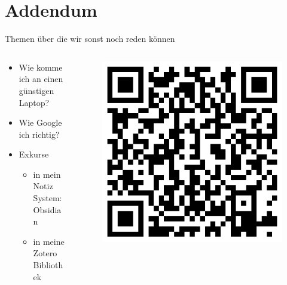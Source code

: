 \documentclass[aspectratio=169,shownotes]{beamer}
\begin{document}
\section{Addendum}
\begin{frame}{Themen über die wir sonst noch reden können}
    \begin{columns}
        \begin{column}{0.6\textwidth}
            \begin{itemize}
                \item Wie komme ich an einen günstigen Laptop?
                \item Wie Google ich richtig?
                \item Exkurse
                \begin{itemize}
                    \item in mein Notiz System: Obsidian
                    \item in meine Zotero Bibliothek
                \end{itemize} 
            \end{itemize}
        \end{column}
        \begin{column}{0.4\textwidth}
            \begin{figure}
                \begin{flushleft}
                    \includegraphics[width=\textwidth,trim={0 0 0 0},clip]{graphics/QRCode.png}
                \end{flushleft}                
            \end{figure}               
        \end{column}
    \end{columns}
\end{frame}
\end{document}
